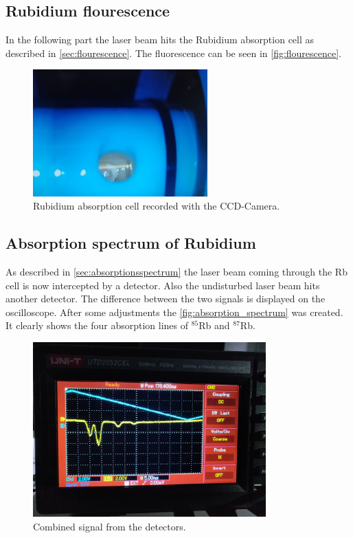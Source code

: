 \FloatBarrier

\subsection{Rubidium flourescence}
\label{sec:rubidium}

In the following part the laser beam hits the Rubidium absorption cell as described in \autoref{sec:flourescence}.
The fluorescence can be seen in \autoref{fig:flourescence}.
\begin{figure}
    \centering
    \includegraphics[width=0.6\textwidth]{content/data/flourescence_scaled.jpeg}
    \caption{Rubidium absorption cell recorded with the CCD-Camera.}
    \label{fig:flourescence}
\end{figure}
\FloatBarrier

\clearpage
\subsection{Absorption spectrum of Rubidium}
\label{sec:absorption}

As described in \autoref{sec:absorptionsspectrum} the laser beam coming through the Rb cell is now intercepted by a detector.
Also the undisturbed laser beam hits another detector.
The difference between the two signals is displayed on the oscilloscope.
After some adjustments the \autoref{fig:absorption_spectrum} was created.
It clearly shows the four absorption lines of $^{85}$Rb and $^{87}$Rb.
\begin{figure}
    \centering
    \includegraphics[width=0.8\textwidth]{content/data/Absorption_spectrum.jpeg}
    \caption{Combined signal from the detectors.}
    \label{fig:absorption_spectrum}
\end{figure}